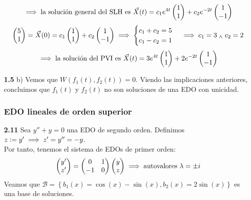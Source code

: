 \[\implies \text{la solución general del SLH es }\vec{X}(t) = c_1 e^{4t} \begin{pmatrix} 1 \\ 1 \end{pmatrix} + c_2 e^{-2t} \begin{pmatrix} 1 \\ -1 \end{pmatrix}\]
\[\begin{pmatrix} 5 \\ 1 \end{pmatrix} = \vec{X}(0) = c_1 \begin{pmatrix} 1 \\ 1 \end{pmatrix} + c_2 \begin{pmatrix} 1 \\ -1 \end{pmatrix} \implies \begin{cases}
		c_1 + c_2 = 5 \\
		c_1 - c_2 = 1
	\end{cases} \implies c_1 = 3 \; _{\wedge} \; c_2 = 2\]
\[\implies \text{la solución del PVI es }\vec{X}(t) = 3 e^{4t} \begin{pmatrix} 1 \\ 1 \end{pmatrix} + 2 e^{-2t} \begin{pmatrix} 1 \\ -1 \end{pmatrix}\]

\textbf{1.5} b) Vemos que $W(f_1(t), f_2(t)) = 0$. Viendo las implicaciones anteriores, concluimos que $f_1(t)$ y $f_2(t)$ no son soluciones de una EDO con unicidad.

\subsubsection{EDO lineales de orden superior}

\textbf{2.11} Sea $y'' +y = 0$ una EDO de segundo orden. Definimos $z\vcentcolon= y' \implies z' = y''= -y$.\\
Por tanto, tenemos el sistema de EDOs de primer orden:
\[\begin{pmatrix}
		y' \\
		z'
	\end{pmatrix} = \begin{pmatrix}
		0  & 1 \\
		-1 & 0
	\end{pmatrix} \begin{pmatrix}
		y \\
		z
	\end{pmatrix} \implies \text{autovalores } \lambda = \pm i\]
Veamos que $\mathcal{B} = \left\{ b_1(x) = \cos(x) - \sin(x), b_2(x) = 2\sin(x) \right\}$ es una base de soluciones.

